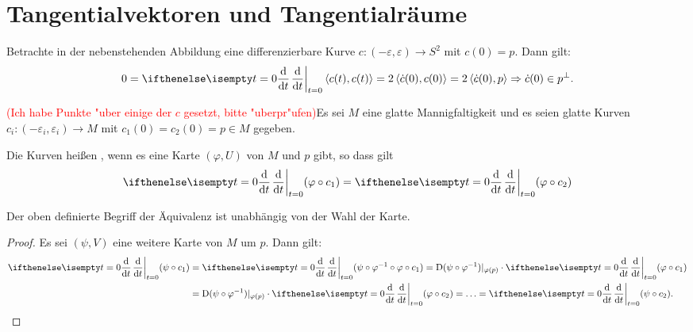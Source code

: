 
\section{Tangentialvektoren und Tangentialräume}


Betrachte in der nebenstehenden Abbildung eine differenzierbare Kurve $c \colon (-\varepsilon,\varepsilon) \to S^2$ mit $c(0) = p$. Dann gilt:
\begin{align*}
  0 = \difffrac[t=0]{}{t} \left<c(t),c(t)\right> = 2\left<\dot c(0),c(0)\right> = 2 \left<\dot c(0),p\right> 
  \Rightarrow \dot c(0) \in p^{\perp}.
\end{align*}


\textcolor{red}{(Ich habe Punkte "uber einige der $c$ gesetzt, bitte "uberpr"ufen)}Es sei $M$ eine glatte Mannigfaltigkeit und es seien glatte Kurven $c_i\colon (-\varepsilon_i,\varepsilon_i) \to M$ mit $c_1(0) = c_2(0) = p \in M$ gegeben.

Die Kurven heißen , wenn es eine Karte $(\varphi,U)$ von $M$ und $p$ gibt, so dass gilt
\begin{align*}
  \difffrac[t=0]{}{t}(\varphi \circ c_1) = \difffrac[t=0]{}{t}(\varphi \circ c_2)
\end{align*}

\begin{lemma}
  Der oben definierte Begriff der Äquivalenz ist unabhängig von der Wahl der Karte.
\end{lemma}

\begin{proof}
  Es sei $(\psi,V)$ eine weitere Karte von $M$ um $p$. Dann gilt:
  \begin{align*}
    \difffrac[t=0]{}{t}(\psi\circ c_1) & = \difffrac[t=0]{}{t}(\psi\circ\varphi^{-1}\circ\varphi \circ c_1) = \D (\psi \circ \varphi^{-1})|_{\varphi(p)} \cdot \difffrac[t=0]{}{t}(\varphi \circ c_1)\\
    & = \D(\psi \circ \varphi^{-1})|_{\varphi(p)} \cdot \difffrac[t=0]{}{t}(\varphi \circ c_2) = \ldots = \difffrac[t=0]{}{t}(\psi \circ c_2).
  \end{align*}
\end{proof}

